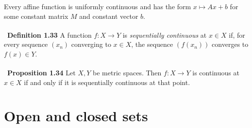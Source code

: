 \documentclass[12 pt]{article}
\numberwithin{equation}{section}
\begin{document}
{Every affine function is uniformly continuous and has the form $x \mapsto Ax + b$ for some constant matrix $M$ and constant vector $b$.\\
\\
\
\textbf{Definition 1.33} A function $f: X \to Y$ is \textit{sequentially continuous} at $x \in X$ if, for every sequence $(x_n)$ converging to $x \in X$, the sequence $(f(x_n))$ converges to $f(x) \in Y$.\\
\\
\
\textbf{Proposition 1.34} Let $X, Y$ be metric spaces. Then $f: X \to Y$ is continuous at $x \in X$ if and only if it is sequentially continuous at that point.











\section{Open and closed sets}


}
\end{document}
